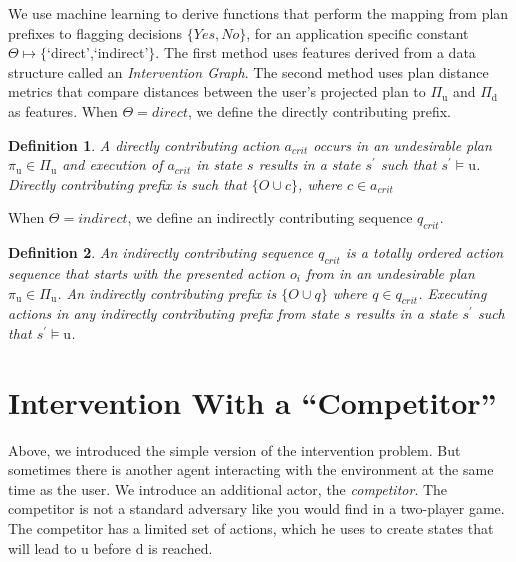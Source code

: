 \documentclass[doctor]{thesis} %
\theoremstyle{plain}
\newtheorem{definition}{Definition}
\begin{document}
We use machine learning to derive functions that perform the mapping from plan prefixes to flagging decisions $\lbrace Yes, No\rbrace$, for an application specific constant $\Theta\mapsto\lbrace$`direct',`indirect'$\rbrace$.
The first method uses features derived from a data structure called an \textit{Intervention Graph}. 
The second method uses plan distance metrics that compare distances between the user's projected plan to $\Pi_{\mathrm{u}}$ and $\Pi_{\mathrm{d}}$ as features. When $\Theta=direct$, we define the directly contributing prefix.
\begin{definition}
A \textnormal{directly contributing action} $a_{crit}$ occurs in an undesirable plan $\pi_{\mathrm{u}}\in \Pi_{\mathrm{u}}$ and execution of $a_{crit}$ in state $s$ results in a state $s^\prime$ such that $s^\prime\models \mathrm{u}$. Directly contributing prefix is such that $\lbrace O\cup c\rbrace$, where $c\in a_{crit}$
\end{definition}
\noindent When $\Theta=indirect$, we define an indirectly contributing sequence $q_{crit}$.
\begin{definition}
An \textnormal{indirectly contributing sequence} $q_{crit}$ is a totally ordered action sequence that starts with the presented action $o_i$ from in an undesirable plan $\pi_{\mathrm{u}}\in \Pi_{\mathrm{u}}$. An indirectly contributing prefix is $\lbrace O\cup q\rbrace $ where $q\in q_{crit}$. Executing actions in any indirectly contributing prefix from state $s$ results in a state $s^\prime$ such that $s^\prime\models \mathrm{u}$. 
\end{definition}

\section*{Intervention With a ``Competitor''}
\label{sec:example}
Above, we introduced the simple version of the intervention problem.
But sometimes there is another agent interacting with the environment at the same time as the user.
We introduce an additional actor, the \textit{competitor}. 
The competitor is not a standard adversary like you would find in a two-player game.
The competitor has a limited set of actions, which he uses to create states that will lead to $\mathrm{u}$ before $\mathrm{d}$ is reached. 
\end{document}
